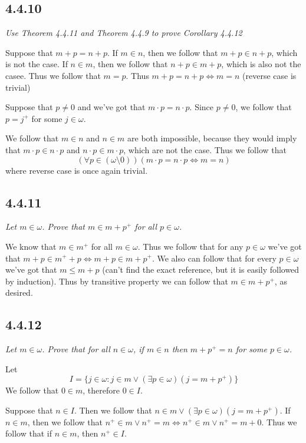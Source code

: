 \documentclass[11pt,oneside,titlepage]{book}
\DeclareMathOperator \lra {\Leftrightarrow}
\begin{document}
\subsection*{4.4.10}

\textit{Use Theorem 4.4.11 and Theorem 4.4.9 to prove Corollary 4.4.12}

Suppose that $m + p = n + p$. If $m \in n$, then we follow that $m + p \in n + p$, which
is not the case.
If $n \in m$, then we follow that $n + p \in m + p$, which is also not the casee.
Thus we follow that $m = p$. Thus $m + p = n + p \lra m = n$ (reverse case is trivial)

Suppose that $p \neq 0$ and we've got that $m \cdot p = n \cdot p$. Since $p \neq 0$, we
follow that $p = j^+$ for some $j \in \omega$.

We follow that $m \in n$ and $n \in m$ are both impossible, because they would imply
that $m \cdot p \in n \cdot p$ and $n \cdot p \in m \cdot p$, which are not the case. Thus
we follow that
$$(\forall p \in (\omega \setminus 0))(m \cdot p = n \cdot p \lra m = n)$$
where reverse case is once again trivial.

\subsection*{4.4.11}

\textit{Let $m \in \omega$. Prove that $m \in m + p^+$ for all $p \in \omega$.}

We know that $m \in m^+$ for all $m \in \omega$. Thus we follow that for any $p \in \omega$
we've got that $m + p \in m^+ + p \lra m + p \in m + p^+$. We also can follow that
for every $p \in \omega$ we've got that $m \leq m + p$ (can't find the exact reference,
but it is easily followed by induction). Thus by transitive property we can follow
that  $m \in m + p^+$, as desired.

\subsection*{4.4.12}

\textit{Let $m \in \omega$. Prove that for all $n \in \omega$, if $m \in n$ then
  $m + p^+ = n$ for some $p \in \omega$.}

Let
$$I = \{j \in \omega: j \in m \lor (\exists p \in \omega)(j = m + p^+) \}$$
We follow that $0 \in m$, therefore $0 \in I$.

Suppose that $n \in I$. Then we follow that $n \in m \lor (\exists p \in \omega) (j = m + p^+)$.
If $n \in m$, then we follow that $n^+ \in m \lor n^+ = m \lra
n^+ \in m \lor n^+ = m + 0 $. Thus we follow that if $n \in m$, then $n^+ \in I$.
\end{document}
